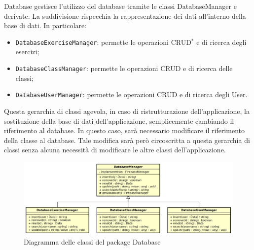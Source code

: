 Database gestisce l'utilizzo del database tramite le classi DatabaseManager e derivate. La suddivisione rispecchia la rappresentazione dei dati all'interno della base di dati. In particolare:
\begin{itemize}
	\item \texttt{DatabaseExerciseManager}: permette le operazioni CRUD$^{*}$ e di ricerca degli esercizi;
	\item \texttt{DatabaseClassManager}: permette le operazioni CRUD e di ricerca delle classi;
	\item \texttt{DatabaseUserManager}: permette le operazioni CRUD e di ricerca degli User.
\end{itemize}
Questa gerarchia di classi agevola, in caso di ristrutturazione dell'applicazione, la sostituzione della base di dati dell'applicazione, semplicemente cambiando il riferimento al database. In questo caso, sarà necessario modificare il riferimento della classe al database. Tale modifica sarà però circoscritta a questa gerarchia di classi senza alcuna necessità di modificare le altre classi dell'applicazione.
\begin{figure}[h]
	\includegraphics[scale=0.5]{images/DatabaseManager.png}
	\caption{Diagramma delle classi del package Database}
\end{figure}